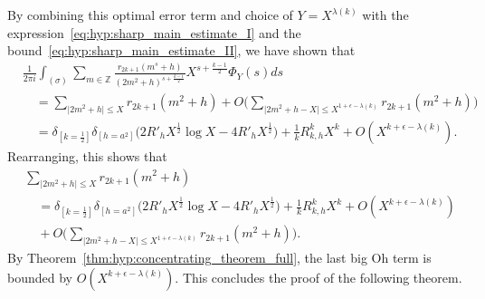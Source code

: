 By combining this optimal error term and choice of $Y = X^{\lambda(k)}$ with the
expression~\eqref{eq:hyp:sharp_main_estimate_I} and the
bound~\eqref{eq:hyp:sharp_main_estimate_II}, we have shown that
\begin{align}
  &\frac{1}{2\pi i} \int_{(\sigma)} \sum_{m \in \mathbb{Z}} \frac{r_{2k+1}{(m^s +
h)}}{(2m^2 + h)^{s + \frac{k-1}{2}}} X^{s + \frac{k-1}{2}} \Phi_Y(s) ds \\
  &\quad =\sum_{\lvert 2m^2 + h \rvert \leq X} r_{2k+1}(m^2 + h) +O \bigg( \sum_{\lvert
  2m^2+h - X \rvert \leq X^{1 + \epsilon - \lambda(k)}} r_{2k+1}(m^2+h)\bigg)  \\
  &\quad = \delta_{[k = \frac{1}{2}]} \delta_{[h = a^2]} \bigg( 2 R'_h X^{\frac{1}{2}}
\log X -4 R'_h X^{\frac{1}{2}} \bigg) + \tfrac{1}{k} R_{k, h}^k X^{k} + O(X^{k + \epsilon
- \lambda(k)}).
\end{align}
Rearranging, this shows that
\begin{align}
  &\sum_{\lvert 2m^2 + h \rvert \leq X} r_{2k+1}(m^2 + h) \\
  &\quad = \delta_{[k = \frac{1}{2}]} \delta_{[h = a^2]} \bigg( 2 R'_h X^{\frac{1}{2}}
\log X -4 R'_h X^{\frac{1}{2}} \bigg) + \tfrac{1}{k} R_{k, h}^k X^{k} + O(X^{k + \epsilon
- \lambda(k)}) \\
  &\quad + O \bigg( \sum_{\lvert 2m^2+h - X \rvert \leq X^{1 + \epsilon - \lambda(k)}}
  r_{2k+1}(m^2+h)\bigg).
\end{align}
By Theorem~\ref{thm:hyp:concentrating_theorem_full}, the last big Oh term is bounded by
$O(X^{k + \epsilon - \lambda(k)})$.
This concludes the proof of the following theorem.


